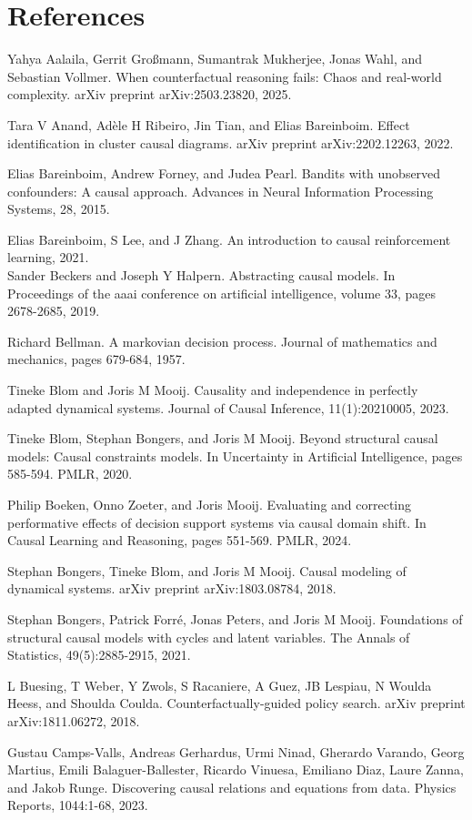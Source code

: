 \documentclass[10pt]{article}
\begin{document}
\section*{References}
Yahya Aalaila, Gerrit Großmann, Sumantrak Mukherjee, Jonas Wahl, and Sebastian Vollmer. When counterfactual reasoning fails: Chaos and real-world complexity. arXiv preprint arXiv:2503.23820, 2025.

Tara V Anand, Adèle H Ribeiro, Jin Tian, and Elias Bareinboim. Effect identification in cluster causal diagrams. arXiv preprint arXiv:2202.12263, 2022.

Elias Bareinboim, Andrew Forney, and Judea Pearl. Bandits with unobserved confounders: A causal approach. Advances in Neural Information Processing Systems, 28, 2015.

Elias Bareinboim, S Lee, and J Zhang. An introduction to causal reinforcement learning, 2021.\\
Sander Beckers and Joseph Y Halpern. Abstracting causal models. In Proceedings of the aaai conference on artificial intelligence, volume 33, pages 2678-2685, 2019.

Richard Bellman. A markovian decision process. Journal of mathematics and mechanics, pages 679-684, 1957.

Tineke Blom and Joris M Mooij. Causality and independence in perfectly adapted dynamical systems. Journal of Causal Inference, 11(1):20210005, 2023.

Tineke Blom, Stephan Bongers, and Joris M Mooij. Beyond structural causal models: Causal constraints models. In Uncertainty in Artificial Intelligence, pages 585-594. PMLR, 2020.

Philip Boeken, Onno Zoeter, and Joris Mooij. Evaluating and correcting performative effects of decision support systems via causal domain shift. In Causal Learning and Reasoning, pages 551-569. PMLR, 2024.

Stephan Bongers, Tineke Blom, and Joris M Mooij. Causal modeling of dynamical systems. arXiv preprint arXiv:1803.08784, 2018.

Stephan Bongers, Patrick Forré, Jonas Peters, and Joris M Mooij. Foundations of structural causal models with cycles and latent variables. The Annals of Statistics, 49(5):2885-2915, 2021.

L Buesing, T Weber, Y Zwols, S Racaniere, A Guez, JB Lespiau, N Woulda Heess, and Shoulda Coulda. Counterfactually-guided policy search. arXiv preprint arXiv:1811.06272, 2018.

Gustau Camps-Valls, Andreas Gerhardus, Urmi Ninad, Gherardo Varando, Georg Martius, Emili Balaguer-Ballester, Ricardo Vinuesa, Emiliano Diaz, Laure Zanna, and Jakob Runge. Discovering causal relations and equations from data. Physics Reports, 1044:1-68, 2023.
\end{document}
